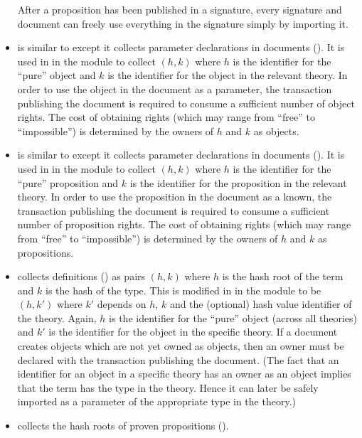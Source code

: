 \begin{itemize}
After a proposition has been published in a signature, every 
signature and document can freely use everything in
the signature simply by importing it.
\item {} is similar to {}
except it collects parameter declarations in documents ({}).
It is used in {}
in the {} module
to collect $(h,k)$ where $h$ is the identifier for the ``pure'' object
and $k$ is the identifier for the object in the relevant theory.
In order to use the object in the document as a parameter, the transaction publishing
the document is required to consume a sufficient number of object rights.
The cost of obtaining rights (which may range from ``free'' to ``impossible'')
is determined by the owners of $h$ and $k$ as objects.
\item {} is similar to {}
except it collects parameter declarations in documents ({}).
It is used in {}
in the {} module
to collect $(h,k)$ where $h$ is the identifier for the ``pure'' proposition
and $k$ is the identifier for the proposition in the relevant theory.
In order to use the proposition in the document as a known, the transaction publishing
the document is required to consume a sufficient number of proposition rights.
The cost of obtaining rights (which may range from ``free'' to ``impossible'')
is determined by the owners of $h$ and $k$ as propositions.
\item {} collects definitions ({})
as pairs $(h,k)$
where $h$ is the hash root of the term and $k$ is the hash of the type.
This is modified in {} in the module {}
to be $(h,k')$ where $k'$ depends on $h$, $k$ and the (optional) hash value identifier of the theory.
Again, $h$ is the identifier for the ``pure'' object (across all theories)
and $k'$ is the identifier for the object in the specific theory.
If a document creates objects which are not yet owned as objects, then an owner must be declared with
the transaction publishing the document.
(The fact that an identifier for an object in a specific theory has an owner as an object
implies that the term has the type in the theory. Hence it can later be safely imported as a parameter
of the appropriate type in the theory.)
\item {} collects the hash roots of proven propositions ({}).

\end{itemize}

